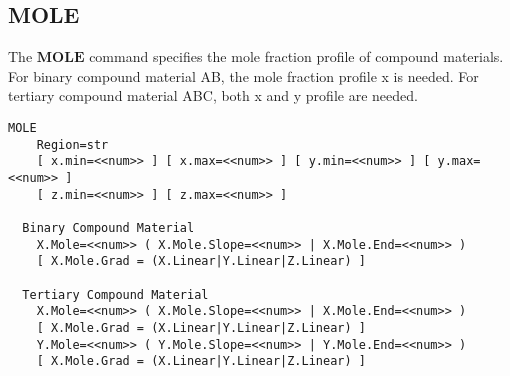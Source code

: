 \documentclass[oneside,12pt]{cgd_book}
\begin{document}
\subsection{MOLE}
The $\mathbf{MOLE}$
command specifies the mole fraction profile of compound materials. For
        binary compound material AB, the mole fraction profile x is needed.
        For tertiary compound material ABC, both x and y profile are
        needed.
\par
\begin{lstlisting}[style=GeniusCmd]
MOLE
    Region=str
    [ x.min=<<num>> ] [ x.max=<<num>> ] [ y.min=<<num>> ] [ y.max=<<num>> ]
    [ z.min=<<num>> ] [ z.max=<<num>> ]

  Binary Compound Material
    X.Mole=<<num>> ( X.Mole.Slope=<<num>> | X.Mole.End=<<num>> )
    [ X.Mole.Grad = (X.Linear|Y.Linear|Z.Linear) ]

  Tertiary Compound Material
    X.Mole=<<num>> ( X.Mole.Slope=<<num>> | X.Mole.End=<<num>> )
    [ X.Mole.Grad = (X.Linear|Y.Linear|Z.Linear) ]
    Y.Mole=<<num>> ( Y.Mole.Slope=<<num>> | Y.Mole.End=<<num>> )
    [ X.Mole.Grad = (X.Linear|Y.Linear|Z.Linear) ]
\end{lstlisting}
\end{document}
